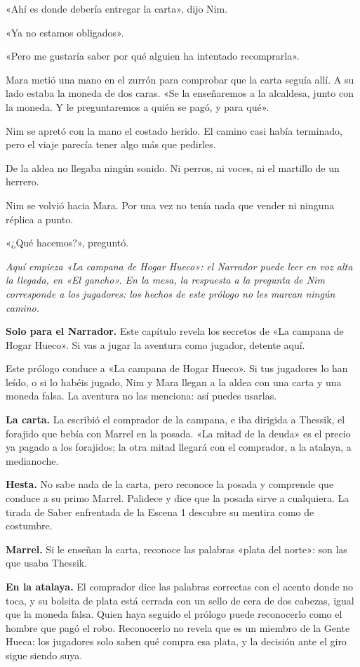 \documentclass[10pt,a4paper]{article}
\begin{document}
«Ahí es donde debería entregar la carta», dijo Nim.

«Ya no estamos obligados».

«Pero me gustaría saber por qué alguien ha intentado recomprarla».

Mara metió una mano en el zurrón para comprobar que la carta seguía allí. A su lado estaba la moneda de dos caras. «Se la enseñaremos a la alcaldesa, junto con la moneda. Y le preguntaremos a quién se pagó, y para qué».

Nim se apretó con la mano el costado herido. El camino casi había terminado, pero el viaje parecía tener algo más que pedirles.

De la aldea no llegaba ningún sonido. Ni perros, ni voces, ni el martillo de un herrero.

Nim se volvió hacia Mara. Por una vez no tenía nada que vender ni ninguna réplica a punto.

«¿Qué hacemos?», preguntó.

\emph{Aquí empieza «La campana de Hogar Hueco»: el Narrador puede leer en voz alta la llegada, en «El gancho». En la mesa, la respuesta a la pregunta de Nim corresponde a los jugadores: los hechos de este prólogo no les marcan ningún camino.}
\endgroup
\clearpage
{}
\begin{rpgnote}
\textbf{Solo para el Narrador.} Este capítulo revela los secretos de «La campana de Hogar Hueco». Si vas a jugar la aventura como jugador, detente aquí.
\end{rpgnote}
Este prólogo conduce a «La campana de Hogar Hueco». Si tus jugadores lo han leído, o si lo habéis jugado, Nim y Mara llegan a la aldea con una carta y una moneda falsa. La aventura no las menciona: así puedes usarlas.

\textbf{La carta.} La escribió el comprador de la campana, e iba dirigida a Thessik, el forajido que bebía con Marrel en la posada. «La mitad de la deuda» es el precio ya pagado a los forajidos; la otra mitad llegará con el comprador, a la atalaya, a medianoche.

\textbf{Hesta.} No sabe nada de la carta, pero reconoce la posada y comprende que conduce a su primo Marrel. Palidece y dice que la posada sirve a cualquiera. La tirada de Saber enfrentada de la Escena 1 descubre su mentira como de costumbre.

\textbf{Marrel.} Si le enseñan la carta, reconoce las palabras «plata del norte»: son las que usaba Thessik.

\textbf{En la atalaya.} El comprador dice las palabras correctas con el acento donde no toca, y su bolsita de plata está cerrada con un sello de cera de dos cabezas, igual que la moneda falsa. Quien haya seguido el prólogo puede reconocerlo como el hombre que pagó el robo. Reconocerlo no revela que es un miembro de la Gente Hueca: los jugadores solo saben qué compra esa plata, y la decisión ante el giro sigue siendo suya.
\end{document}
